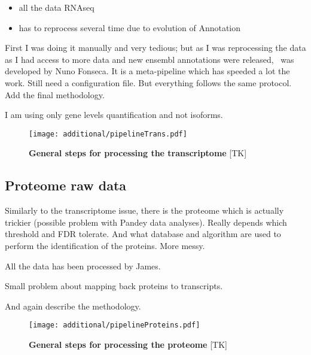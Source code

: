 \begin{itemize}
        \item all the data RNAseq
        \item has to reprocess several time due to evolution of Annotation
\end{itemize}

First I  was doing it manually and very tedious; but as I was reprocessing the data
as I had access to more data and new ensembl annotations were released, \irap\
was developed by Nuno Fonseca. It is a meta-pipeline which has speeded a lot the
work. Still need a configuration file. But everything follows the same protocol.
Add the final methodology.

I am using only gene levels quantification and not isoforms.

\begin{figure}
    \texttt{[image: additional/pipelineTrans.pdf]}\centering
    \caption[General steps for processing the transcriptomic
    data]{\label{fig:pipelineTrans}\textbf{General steps for processing the
    transcriptome} [TK]}
  \end{figure}


\subsection{Proteome raw data}

Similarly to the transcriptome issue, there is the proteome which is actually
trickier (possible problem with Pandey data analyses). Really depends which
threshold and \gls{FDR} tolerate. And what database and algorithm are used to perform
the identification of the proteins. More messy.

All the data has been processed by James.

Small problem about mapping back proteins to transcripts.



And again describe the methodology.

  \begin{figure}
      \texttt{[image: additional/pipelineProteins.pdf]}\centering
      \caption[General steps for processing the proteome
      data]{\label{fig:pipelineProt}\textbf{General steps for processing the
      proteome} [TK] }
  \end{figure}

